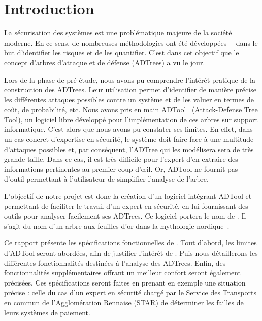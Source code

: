 \section{Introduction}
	La sécurisation des systèmes est une problématique majeure de la société moderne. En ce sens, de nombreuses méthodologies ont été développées~\cite{introSecurite}~\cite{ADTreeKordy} dans le but d'identifier les risques et de les quantifier. C'est dans cet objectif que le concept d'arbres d'attaque et de défense (ADTrees) a vu le jour.

	Lors de la phase de pré-étude, nous avons pu comprendre l’intérêt pratique de la construction des ADTrees. Leur utilisation permet d'identifier de manière précise les différentes attaques possibles contre un système et de les valuer en termes de coût, de probabilité, etc. Nous avons pris en main ADTool~\cite{adtool_paper} (Attack-Defense Tree Tool), un logiciel libre développé pour l'implémentation de ces arbres sur support informatique. C'est alors que nous avons pu constater ses limites. En effet, dans un cas concret d'expertise en sécurité, le système doit faire face à une multitude d'attaques possibles et, par conséquent, l'ADTree qui les modélisera sera de très grande taille. Dans ce cas, il est très difficile pour l'expert d'en extraire des informations pertinentes au premier coup d’œil. Or, ADTool ne fournit pas d'outil permettant à l'utilisateur de simplifier l'analyse de l'arbre. 

	L'objectif de notre projet est donc la création d'un logiciel intégrant ADTool et permettant de faciliter le travail d'un expert en sécurité, en lui fournissant des outils pour analyser facilement ses ADTrees. Ce logiciel portera le nom de \glasir. Il s'agit du nom d'un arbre aux feuilles d'or dans la mythologie nordique~\cite{vikingCulture}.

	Ce rapport présente les spécifications fonctionnelles de \glasir{}. Tout d'abord, les limites d'ADTool seront abordées, afin de justifier l'intérêt de \glasir{}. Puis nous détaillerons les différentes fonctionnalités destinées à l'analyse des ADTrees. Enfin, des fonctionnalités supplémentaires offrant un meilleur confort seront également précisées. Ces spécifications seront faites en prenant en exemple une situation précise : celle du cas d'un expert en sécurité chargé par le Service des Transports en commun de l'Agglomération Rennaise (STAR) de déterminer les failles de leurs systèmes de paiement.